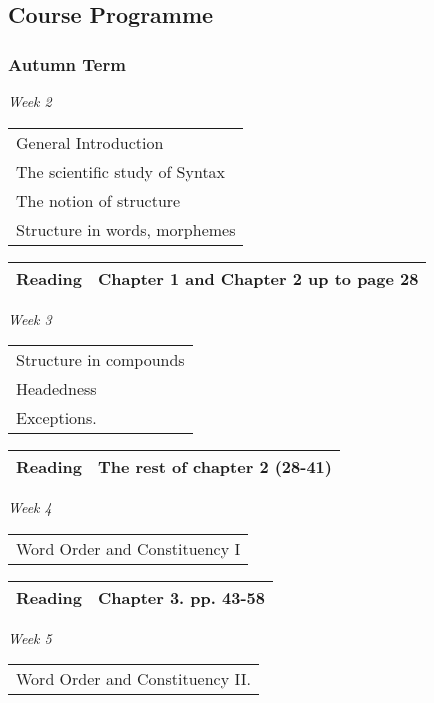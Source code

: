 \documentclass[12pt]{article}
\begin{document}
\subsection{Course Programme}
\subsubsection*{Autumn Term}

\noindent \textit{Week 2} \dotfill \begin{tabular}[t]{l} General Introduction\\[-4mm] The scientific study of Syntax\\[-4mm] The notion of structure\\[-4mm] Structure in words, morphemes\\ \end{tabular}
\begin{flushright}
\begin{tabular}[t]{|l|p{2in}|}\hline \textbf{Reading} & Chapter 1 and Chapter 2 up to page 28 \\\hline \end{tabular}
\end{flushright}
\textit{Week 3} \dotfill \begin{tabular}[t]{l} Structure in compounds\\[-4mm] Headedness\\[-4mm] Exceptions. \end{tabular}
\begin{flushright}
\begin{tabular}[t]{|l|p{2in}|}\hline \textbf{Reading} & The rest of chapter 2 (28-41) \\\hline \end{tabular}
\end{flushright}
\textit{Week 4} \dotfill \begin{tabular}[t]{l} Word Order and Constituency I \end{tabular}
\begin{flushright}
\begin{tabular}[t]{|l|p{2in}|}\hline \textbf{Reading} & Chapter 3.  pp. 43-58 \\\hline \end{tabular}
\end{flushright}
\textit{Week 5} \dotfill \begin{tabular}[t]{l} Word Order and Constituency II. \end{tabular}
\end{document}
